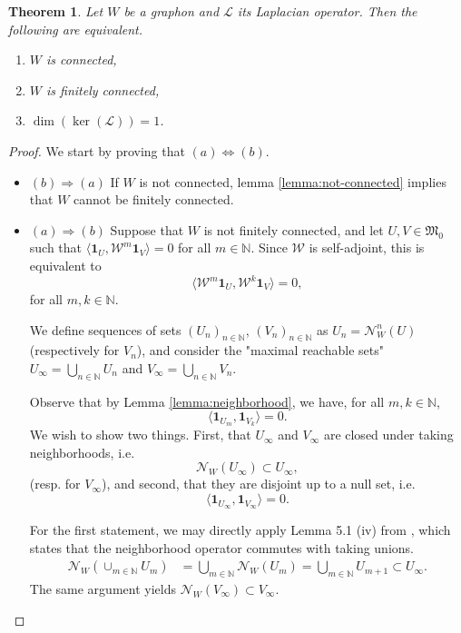 \documentclass[11pt]{article}
\def\N{\mathbb{N}}
\def\ker{\operatorname{ker}}
\def\dim{\operatorname{dim}}
\def\II{\bm{1}}
\def\calW{\mathcal{W}}
\def\calL{\mathcal{L}}
\def\frakM{\mathfrak{M}_0}
\newtheorem{theorem}{Theorem}[section]
\theoremstyle{definition}
\begin{document}
\begin{theorem}
    Let $W$ be a graphon and $\calL$ its Laplacian operator. Then the following are equivalent.
    \begin{enumerate}[label=(\alph*)]
        \item $W$ is connected,
        \item $W$ is finitely connected,
        \item $\dim(\ker(\calL)) = 1$.
    \end{enumerate}
\end{theorem}
\begin{proof}
    We start by proving that $(a) \Leftrightarrow (b)$.
    \begin{itemize}
        \item $(b) \Rightarrow (a)$ If $W$ is not connected, lemma \ref{lemma:not-connected} implies that $W$ cannot be finitely connected.
        \item $(a) \Rightarrow (b)$ Suppose that $W$ is not finitely connected, and let $U,V \in \frakM$ such that $\langle \II_U, \calW^m \II_V \rangle = 0$ for all $m \in \N$. Since $\calW$ is self-adjoint, this is equivalent to 
        $$\langle \calW^{m} \II_U, \calW^{k} \II_V \rangle = 0,$$ 
        for all $m,k\in\N$. 
        
        We define sequences of sets $(U_n)_{n\in\N}$, $(V_n)_{n\in\N}$ as $U_n = \mathcal{N}_W^n (U)$ (respectively for $V_n$), and consider the "maximal reachable sets" $U_\infty = \bigcup_{n\in \N} U_n$ and $V_\infty = \bigcup_{n\in\N} V_n$. 
        
        Observe that by Lemma \ref{lemma:neighborhood}, we have, for all $m, k \in \N$,
        $$ \langle \II_{U_m}, \II_{V_k}\rangle= 0. $$
        We wish to show two things. First, that $U_\infty$ and $V_\infty$ are closed under taking neighborhoods, i.e.
        $$ \mathcal{N}_W(U_\infty) \subset U_\infty, $$
        (resp. for $V_\infty$), and second, that they are disjoint up to a null set, i.e.
        $$ \langle \II_{U_\infty}, \II_{V_\infty} \rangle = 0. $$

        For the first statement, we may directly apply Lemma 5.1 (iv) from \cite{jansonConnectednessGraphLimits2008}, which states that the neighborhood operator commutes with taking unions.
        \begin{align*}
            \mathcal{N}_W (\cup_{m\in \N} U_m) &= \bigcup_{m\in \N} \mathcal{N}_W (U_m) = \bigcup_{m\in \N} U_{m+1}\subset U_\infty.
        \end{align*}
        The same argument yields $\mathcal{N}_W (V_\infty) \subset V_\infty$.


\end{itemize}
\end{proof}
\end{document}
